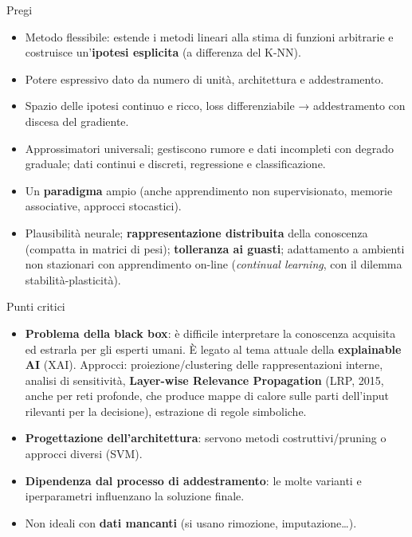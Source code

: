 \begin{boxabstract}{Pregi}

\begin{itemize}
\tightlist
\item
  Metodo flessibile: estende i metodi lineari alla stima di funzioni
  arbitrarie e costruisce un'\textbf{ipotesi esplicita} (a differenza
  del K-NN).
\item
  Potere espressivo dato da numero di unità, architettura e
  addestramento.
\item
  Spazio delle ipotesi continuo e ricco, loss differenziabile →
  addestramento con discesa del gradiente.
\item
  Approssimatori universali; gestiscono rumore e dati incompleti con
  degrado graduale; dati continui e discreti, regressione e
  classificazione.
\item
  Un \textbf{paradigma} ampio (anche apprendimento non supervisionato,
  memorie associative, approcci stocastici).
\item
  Plausibilità neurale; \textbf{rappresentazione distribuita} della
  conoscenza (compatta in matrici di pesi); \textbf{tolleranza ai
  guasti}; adattamento a ambienti non stazionari con apprendimento
  on-line (\emph{continual learning}, con il dilemma
  stabilità-plasticità).
\end{itemize}

\end{boxabstract}

\begin{boxwarning}{Punti critici}

\begin{itemize}
\tightlist
\item
  \textbf{Problema della black box}: è difficile interpretare la
  conoscenza acquisita ed estrarla per gli esperti umani. È legato al
  tema attuale della \textbf{explainable AI} (XAI). Approcci:
  proiezione/clustering delle rappresentazioni interne, analisi di
  sensitività, \textbf{Layer-wise Relevance Propagation} (LRP, 2015,
  anche per reti profonde, che produce mappe di calore sulle parti
  dell'input rilevanti per la decisione), estrazione di regole
  simboliche.
\item
  \textbf{Progettazione dell'architettura}: servono metodi
  costruttivi/pruning o approcci diversi (SVM).
\item
  \textbf{Dipendenza dal processo di addestramento}: le molte varianti e
  iperparametri influenzano la soluzione finale.
\item
  Non ideali con \textbf{dati mancanti} (si usano rimozione,
  imputazione\ldots).
\end{itemize}

\end{boxwarning}

